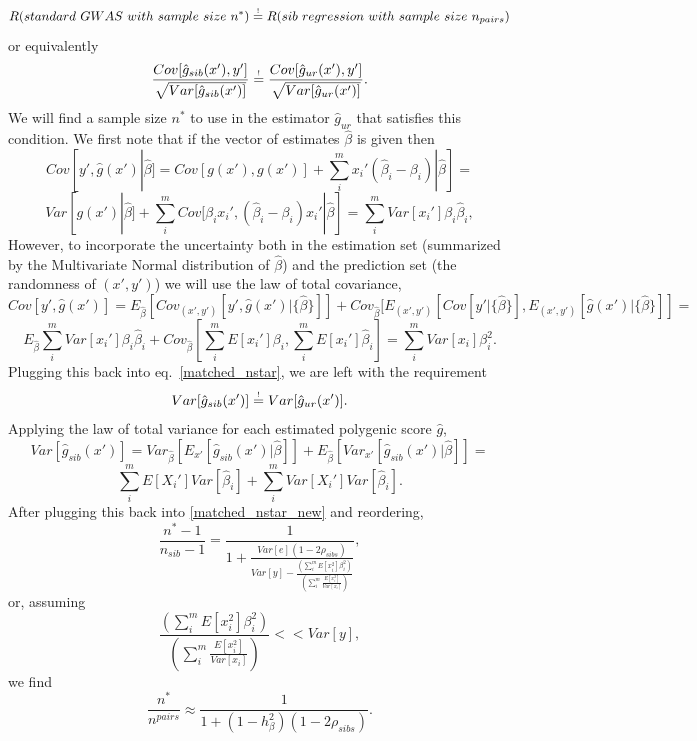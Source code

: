 \documentclass[hidelinks, 12pt]{article}
\begin{document}
$$R(standard~GWAS~with~sample~size~n^*) \reqeq R(sib~regression~with~sample~size~n_{pairs})$$
or equivalently
\begin{equation}
\label{matched_nstar}
\frac{Cov[\hat{g}_{sib}(x'),y']}{\sqrt{Var[\hat{g}_{sib}(x')]}} \reqeq \frac{Cov[\hat{g}_{ur}(x'),y']}{\sqrt{Var[\hat{g}_{ur}(x')]}}.
\end{equation}
We will find a sample size $n^*$ to use in the estimator $\hat{g}_{ur}$ that satisfies this condition.  We first note that if the vector of estimates $\hat{\beta}$ is given then
$$ Cov[y',\hat{g}(x')|\hat{\beta}]=Cov[g(x'),g(x')]+\sum_i^m{x_i'(\hat{\beta}_i-\beta_i)}|\hat{\beta}] = $$
$$Var[g(x')|\hat{\beta}]+\sum_i^m{Cov[\beta_ix_i',(\hat{\beta}_i-\beta_i)x_i'}|\hat{\beta}]=\sum_i^mVar[x_i']\beta_i\hat{\beta}_i,$$
However, to incorporate the uncertainty both in the estimation set (summarized by the Multivariate Normal distribution of $\hat{\beta}$) and the prediction set (the randomness of $(x',y')$) we will use the law of total covariance,
$$ Cov[y',\hat{g}(x')]=E_{\hat{\beta}}[Cov_{(x',y')}[y',\hat{g}(x')|\{\hat{\beta}\}]]+Cov_{\hat{\beta}}[E_{(x',y')}[Cov[y'|\{\hat{\beta}\}],E_{(x',y')}[\hat{g}(x')|\{\hat{\beta}\}]]=$$
$$E_{\hat{\beta}}\sum_i^mVar[x_i']\beta_i\hat{\beta}_i+Cov_{\hat{\beta}}[\sum_i^mE[x_i']\beta_i,\sum_i^mE[x_i']\hat{\beta}_i]=\sum_i^mVar[x_i]\beta_i^2.$$
Plugging this back into eq.~\ref{matched_nstar}, we are left with the requirement 
\begin{equation}
\label{matched_nstar_new}
Var[\hat{g}_{sib}(x')] \reqeq Var[\hat{g}_{ur}(x')].
\end{equation}
Applying the law of total variance for each estimated polygenic score $\hat{g}$,
$$Var[\hat{g}_{sib}(x')] =Var_{\hat{\beta}}[E_{x'}[\hat{g}_{sib}(x')|\hat{\beta}]]+E_{\hat{\beta}}[Var_{x'}[\hat{g}_{sib}(x')|\hat{\beta}]] =$$
$$\sum_i^mE[X_i']Var[\hat{\beta}_i]+\sum_i^mVar[X_i']Var[\hat{\beta}_i].$$
After plugging this back into \ref{matched_nstar_new} and reordering, 
$$\frac{n^*-1}{n_{sib}-1}=\frac{1}{1+\frac{Var[e](1-2\rho_{sibs})}{Var[y]-\frac{(\sum_i^mE[x_i^2]\beta_i^2)}{(\sum_i^m\frac{E[x_i^2]}{Var[x_i]})}}},$$
or, assuming 
$$\frac{(\sum_i^mE[x_i^2]\beta_i^2)}{(\sum_i^m\frac{E[x_i^2]}{Var[x_i]})} << Var[y],$$ 
we find
\begin{equation}
\label{final_nstar_just_direct}
\frac{n^*}{n^{pairs}} \approx \frac{1}{1+(1-h_{\beta}^2)(1-2\rho_{sibs})}.
\end{equation}
\end{document}
